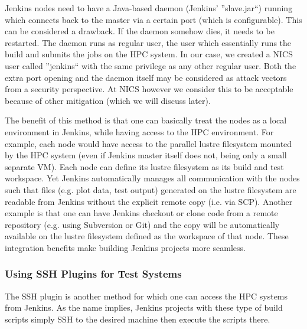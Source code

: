 \documentclass[AMA]{WileyNJD-v1}
\begin{document}
Jenkins nodes need to have a Java-based daemon (Jenkins' ''slave.jar``) running which connects back to the master via a certain port (which is configurable). 
This can be considered a drawback. 
If the daemon somehow dies, it needs to be restarted. 
The daemon runs as regular user, the user which essentially runs the build and submits the jobs on the HPC system. 
In our case, we created a NICS user called ''jenkins`` with the same privilege as any other regular user. 
Both the extra port opening and the daemon itself may be considered as attack vectors from a security perspective. 
At NICS however we consider this to be acceptable because of other mitigation (which we will discuss later).

The benefit of this method is that one can basically treat the nodes as a local environment in Jenkins, while having access to the HPC environment. 
For example, each node would have access to the parallel lustre filesystem mounted by the HPC system (even if Jenkins master itself does not, being only a small separate VM). 
Each node can define its lustre filesystem as its build and test workspace. 
Yet Jenkins automatically manages all communication with the nodes such that files (e.g. plot data, test output) generated on the lustre filesystem are readable from Jenkins without the explicit remote copy (i.e. via SCP). 
Another example is that one can have Jenkins checkout or clone code from a remote repository (e.g. using Subversion or Git) and the copy will be automatically available on the lustre filesystem defined as the workspace of that node. 
These integration benefits make building Jenkins projects more seamless.

\subsubsection{Using SSH Plugins for Test Systems}
The SSH plugin \cite{JenkinsSSHPlugin} is another method for which one can access the HPC systems from Jenkins. 
As the name implies, Jenkins projects with these type of build scripts simply SSH to the desired machine then execute the scripts there. 
\end{document}
